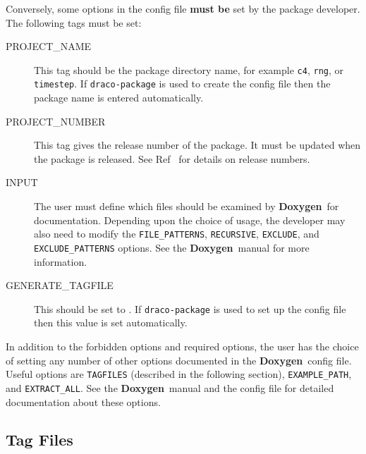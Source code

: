 \documentclass[11pt]{nmemo}
\newcommand{\doxy}{{\normalfont\bfseries Doxygen}}
\begin{document}
Conversely, some options in the config file {\bf must be} set by the
package developer.  The following tags must be set:
\begin{description}

\item[\ttfamily PROJECT\_NAME] This tag should be the package
  directory name, for example \texttt{c4}, \texttt{rng}, or
  \texttt{timestep}.  If \texttt{draco-package} is used to create the
  config file then the package name is entered automatically.
  
\item[\ttfamily PROJECT\_NUMBER] This tag gives the release number of
  the package.  It must be updated when the package is released.  See
  Ref~\cite{xtm:9936} for details on release numbers.
  
\item[\ttfamily INPUT] The user must define which files should be
  examined by \doxy\ for documentation.  Depending upon the choice of
  usage, the developer may also need to modify the
  \texttt{FILE\_PATTERNS}, \texttt{RECURSIVE}, \texttt{EXCLUDE}, and
  \texttt{EXCLUDE\_PATTERNS} options.  See the \doxy\ manual for more
  information.
  
\item[\ttfamily GENERATE\_TAGFILE] This should be set to
  .  If \texttt{draco-package} is used to
  set up the config file then this value is set automatically.

\end{description}

In addition to the forbidden options and required options, the user
has the choice of setting any number of other options documented in
the \doxy\ config file.  Useful options are \texttt{TAGFILES}
(described in the following section), \texttt{EXAMPLE\_PATH}, and
\texttt{EXTRACT\_ALL}.  See the \doxy\ manual and the config file for
detailed documentation about these options.
  
\subsection{Tag Files}
\end{document}
